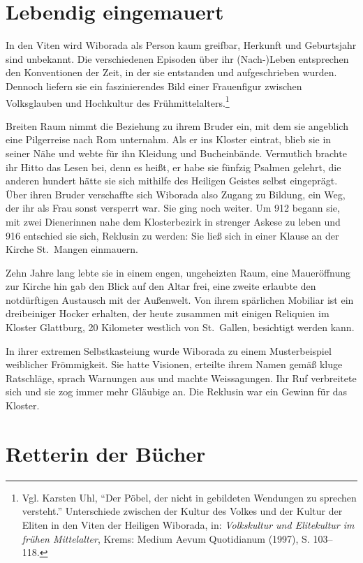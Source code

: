 \documentclass[a4paper,
fontsize=11pt,
oneside,
numbers=noperiodatend,
parskip=half-,
bibliography=totoc,
final
]{scrartcl}
\begin{document}
\section*{Lebendig eingemauert}\label{lebendig-eingemauert}

In den Viten wird Wiborada als Person kaum greifbar, Herkunft und
Geburtsjahr sind unbekannt. Die verschiedenen Episoden über ihr
(Nach-)Leben entsprechen den Konventionen der Zeit, in der sie
entstanden und aufgeschrieben wurden. Dennoch liefern sie ein
faszinierendes Bild einer Frauenfigur zwischen Volksglauben und
Hochkultur des Frühmittelalters.\footnote{Vgl. Karsten Uhl, \enquote{Der
  Pöbel, der nicht in gebildeten Wendungen zu sprechen versteht.}
  Unterschiede zwischen der Kultur des Volkes und der Kultur der Eliten
  in den Viten der Heiligen Wiborada, in: \emph{Volkskultur und
  Elitekultur im frühen Mittelalter}, Krems: Medium Aevum Quotidianum
  (1997), S. 103--118.}

Breiten Raum nimmt die Beziehung zu ihrem Bruder ein, mit dem sie
angeblich eine Pilgerreise nach Rom unternahm. Als er ins Kloster
eintrat, blieb sie in seiner Nähe und webte für ihn Kleidung und
Bucheinbände. Vermutlich brachte ihr Hitto das Lesen bei, denn es heißt,
er habe sie fünfzig Psalmen gelehrt, die anderen hundert hätte sie sich
mithilfe des Heiligen Geistes selbst eingeprägt. Über ihren Bruder
verschaffte sich Wiborada also Zugang zu Bildung, ein Weg, der ihr als
Frau sonst versperrt war. Sie ging noch weiter. Um 912 begann sie, mit
zwei Dienerinnen nahe dem Klosterbezirk in strenger Askese zu leben und
916 entschied sie sich, Reklusin zu werden: Sie ließ sich in einer
Klause an der Kirche St.~Mangen einmauern.

Zehn Jahre lang lebte sie in einem engen, ungeheizten Raum, eine
Maueröffnung zur Kirche hin gab den Blick auf den Altar frei, eine
zweite erlaubte den notdürftigen Austausch mit der Außenwelt. Von ihrem
spärlichen Mobiliar ist ein dreibeiniger Hocker erhalten, der heute
zusammen mit einigen Reliquien im Kloster Glattburg, 20 Kilometer
westlich von St.~Gallen, besichtigt werden kann.

In ihrer extremen Selbstkasteiung wurde Wiborada zu einem Musterbeispiel
weiblicher Frömmigkeit. Sie hatte Visionen, erteilte ihrem Namen gemäß
kluge Ratschläge, sprach Warnungen aus und machte Weissagungen. Ihr Ruf
verbreitete sich und sie zog immer mehr Gläubige an. Die Reklusin war
ein Gewinn für das Kloster.

\section*{Retterin der Bücher}\label{retterin-der-buxfccher}
\end{document}
